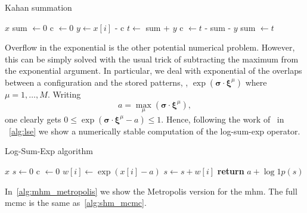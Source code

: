 \documentclass[\rootdir/main.tex]{subfiles}
\begin{document}
\begin{algorithm}
    \caption{Kahan summation}
    \label{alg:kahan_summation}
    \begin{algorithmic}[1]
    \Require $x$
    \State sum $\gets 0$
    \State c $\gets 0$
        \State $y \gets x[i]$ - c
        \State $t \gets $ sum + $y$
        \State c $\gets t$ - sum - $y$
        \State sum $\gets t$
    \EndFor
    \end{algorithmic}
\end{algorithm}

Overflow in the exponential is the other potential numerical problem. However, this can be simply solved with the usual trick of subtracting the maximum from the exponential argument. In particular, we deal with exponential of the overlaps between a configuration and the stored patterns, \ie, $\exp\left(\symbf{\sigma}\cdot \symbf{\xi}^{\mu}\right)$ where $\mu = 1,\dots, M$. Writing
\begin{equation*}
    a = \max_{\mu} \left(\symbf{\sigma} \cdot \symbf{\xi}^{\mu}\right),
\end{equation*}
one clearly gets $0 \leq \exp\left(\symbf{\sigma}\cdot \symbf{\xi}^{\mu} - a\right) \leq 1$.
Hence, following the work of~\textcite{numerically_stable} in ~\cref{alg:lse} we show a numerically stable computation of the log-sum-exp operator.

\begin{algorithm}
    \caption{Log-Sum-Exp algorithm}
    \label{alg:lse}
    \begin{algorithmic}[1]
    \Require $x$
    \State $s \gets 0$
    \State c $\gets 0$
        \State $w[i] \gets \exp\left(x[i] - a\right)$
            \State $s \gets s + w[i]$
        \EndIf
    \EndFor
    \textbf{return} $a + \log1p (s)$ 
    \end{algorithmic}
\end{algorithm}

In~\cref{alg:mhm_metropolis} we show the Metropolis version for the \acrlong{mhm}. The full \acrlong{mcmc} is the same as~\cref{alg:shm_mcmc}.
\end{document}
